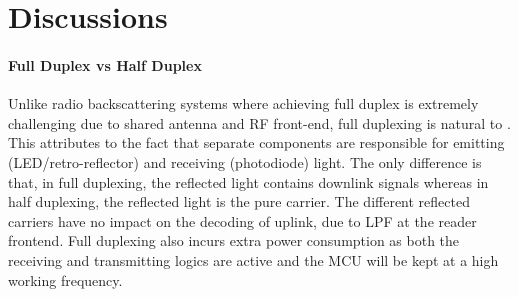 \section{Discussions}

\paragraph{Full Duplex vs Half Duplex}
Unlike radio backscattering systems where achieving full duplex is extremely challenging due to shared antenna and RF front-end, full duplexing is natural to \retro. This attributes to the fact that separate components are responsible for emitting (LED/retro-reflector) and receiving (photodiode) light. The only difference is that, in full duplexing, the reflected light contains downlink signals whereas in half duplexing, the reflected light is the pure carrier. The different reflected carriers have no impact on the decoding of uplink, due to LPF at the reader frontend.  Full duplexing also incurs extra power consumption as both the receiving and transmitting logics are active and the MCU will be kept at a high working frequency.%
 

